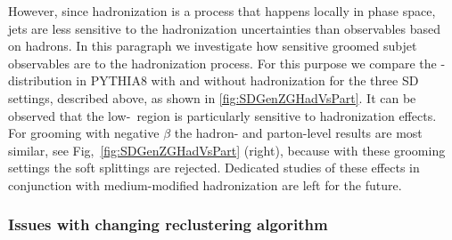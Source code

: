 However, since hadronization is a process that happens locally in phase space, jets are less sensitive to the hadronization uncertainties than observables based on hadrons. In this paragraph we investigate how sensitive groomed subjet observables are to the hadronization process. For this purpose we compare the \zg-distribution in PYTHIA8 with and without hadronization for the three SD settings, described above, as shown in \autoref{fig:SDGenZGHadVsPart}. It can be observed that the low-\zg\, region is particularly sensitive to hadronization effects. For grooming with negative $\beta$ the hadron- and parton-level results are most similar, see Fig,~\ref{fig:SDGenZGHadVsPart} (right), because with these grooming settings the soft splittings are rejected. Dedicated studies of these effects in conjunction with medium-modified hadronization are left for the future.

\subsubsection{Issues with changing reclustering algorithm}
\label{sec:reclusteringalgo}

